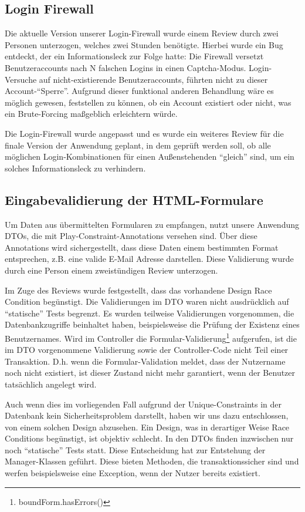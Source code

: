 \documentclass[12pt,DIV14,BCOR10mm,a4paper,parskip=half-,headsepline,headinclude,english,ngerman,bibliography=totocnumbered]{scrreprt}
\begin{document}
\subsection{Login Firewall}
Die aktuelle Version unserer Login-Firewall wurde einem Review durch zwei Personen unterzogen, welches zwei Stunden benötigte. Hierbei wurde ein Bug entdeckt, der ein Informationsleck zur Folge hatte: Die Firewall versetzt Benutzeraccounts nach N falschen Logins in einen Captcha-Modus. Login-Versuche auf nicht-existierende Benutzeraccounts, führten nicht zu dieser Account-\enquote{Sperre}. Aufgrund dieser funktional anderen Behandlung wäre es möglich gewesen, feststellen zu können, ob ein Account existiert oder nicht, was ein Brute-Forcing maßgeblich erleichtern würde.

Die Login-Firewall wurde angepasst und es wurde ein weiteres Review für die finale Version der Anwendung geplant, in dem geprüft werden soll, ob alle möglichen Login-Kombinationen für einen Außenstehenden \enquote{gleich} sind, um ein solches Informationsleck zu verhindern.

\subsection{Eingabevalidierung der HTML-Formulare}
Um Daten aus übermittelten Formularen zu empfangen, nutzt unsere Anwendung DTOs, die mit Play-Constraint-Annotations versehen sind. Über diese Annotations wird sichergestellt, dass diese Daten einem bestimmten Format entsprechen, z.B. eine valide E-Mail Adresse darstellen. Diese Validierung wurde durch eine Person einem zweistündigen Review unterzogen.

Im Zuge des Reviews wurde festgestellt, dass das vorhandene Design Race Condition begünstigt. Die Validierungen im DTO waren nicht ausdrücklich auf \enquote{statische} Tests begrenzt. Es wurden teilweise Validierungen vorgenommen, die Datenbankzugriffe beinhaltet haben, beispielsweise die Prüfung der Existenz eines Benutzernames. Wird im Controller die Formular-Validierung\footnote{boundForm.hasErrors()} aufgerufen, ist die im DTO vorgenommene Validierung sowie der Controller-Code nicht Teil einer Transaktion. D.h. wenn die Formular-Validation meldet, dass der Nutzername noch nicht existiert, ist dieser Zustand nicht mehr garantiert, wenn der Benutzer tatsächlich angelegt wird.

Auch wenn dies im vorliegenden Fall aufgrund der Unique-Constraints in der Datenbank kein Sicherheitsproblem darstellt, haben wir uns dazu entschlossen, von einem solchen Design abzusehen. Ein Design, was in derartiger Weise Race Conditions begünstigt, ist objektiv schlecht. In den DTOs finden inzwischen nur noch \enquote{statische} Tests statt. Diese Entscheidung hat zur Entstehung der Manager-Klassen geführt. Diese bieten Methoden, die transaktionssicher sind und werfen beispielsweise eine Exception, wenn der Nutzer bereits existiert.
\end{document}

